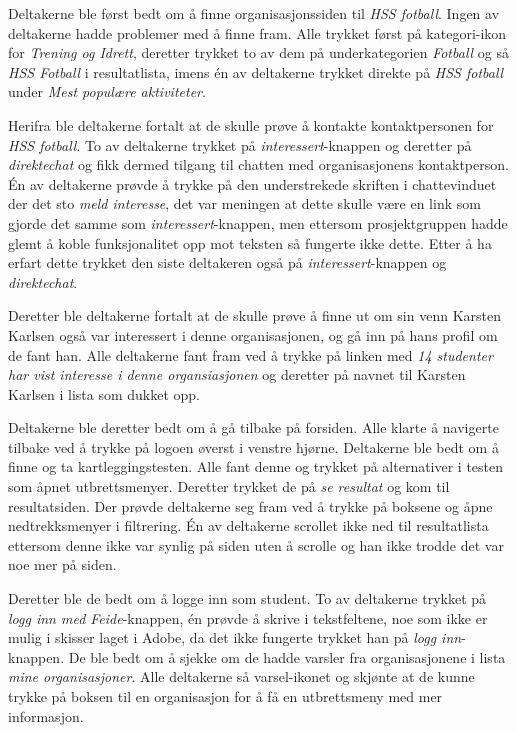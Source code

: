 Deltakerne ble først bedt om å finne organisasjonssiden til {\em HSS fotball}. Ingen av deltakerne hadde problemer med å finne fram. Alle trykket først på kategori-ikon for {\em Trening og Idrett}, deretter trykket to av dem på underkategorien {\em Fotball} og så {\em HSS Fotball} i resultatlista, imens én av deltakerne trykket direkte på {\em HSS fotball} under {\em Mest populære aktiviteter}. 

Herifra ble deltakerne fortalt at de skulle prøve å kontakte kontaktpersonen for {\em HSS fotball}. To av deltakerne trykket på {\em interessert}-knappen og deretter på {\em direktechat} og fikk dermed tilgang til chatten med organisasjonens kontaktperson. Én av deltakerne prøvde å trykke på den understrekede skriften i chattevinduet der det sto {\em meld interesse}, det var meningen at dette skulle være en link som gjorde det samme som {\em interessert}-knappen, men ettersom prosjektgruppen hadde glemt å koble funksjonalitet opp mot teksten så fungerte ikke dette. Etter å ha erfart dette trykket den siste deltakeren også på {\em interessert}-knappen og {\em direktechat}.

Deretter ble deltakerne fortalt at de skulle prøve å finne ut om sin venn Karsten Karlsen også var interessert i denne organisasjonen, og gå inn på hans profil om de fant han. Alle deltakerne fant fram ved å trykke på linken med {\em 14 studenter har vist interesse i denne organsiasjonen} og deretter på navnet til Karsten Karlsen i lista som dukket opp.

Deltakerne ble deretter bedt om å gå tilbake på forsiden. Alle klarte å navigerte tilbake ved å trykke på logoen øverst i venstre hjørne. Deltakerne ble bedt om å finne og ta kartleggingstesten. Alle fant denne og trykket på alternativer i testen som åpnet utbrettsmenyer. Deretter trykket de på {\em se resultat} og kom til resultatsiden. Der prøvde deltakerne seg fram ved å trykke på boksene og åpne nedtrekksmenyer i filtrering. Én av deltakerne scrollet ikke ned til resultatlista ettersom denne ikke var synlig på siden uten å scrolle og han ikke trodde det var noe mer på siden.

Deretter ble de bedt om å logge inn som student. To av deltakerne trykket på {\em logg inn med Feide}-knappen, én prøvde å skrive i tekstfeltene, noe som ikke er mulig i skisser laget i Adobe, da det ikke fungerte trykket han på {\em logg inn}-knappen. De ble bedt om å sjekke om de hadde varsler fra organisasjonene i lista {\em mine organisasjoner}. Alle deltakerne så varsel-ikonet og skjønte at de kunne trykke på boksen til en organisasjon for å få en utbrettsmeny med mer informasjon.

